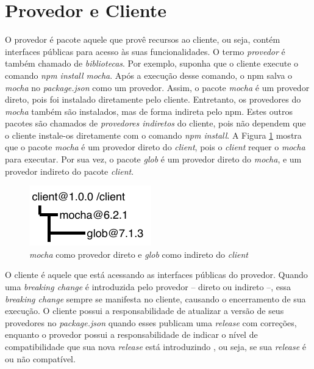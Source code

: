 \section{Provedor e Cliente}
\label{ref-teo:prov_clie}
O provedor é pacote aquele que provê recursos ao cliente, ou seja, contém interfaces públicas para acesso às suas funcionalidades. O termo \textit{provedor} é também chamado de \textit{bibliotecas}. Por exemplo, suponha que o cliente execute o comando \textit{npm install mocha}. Após a execução desse comando, o \gls{npm} salva o \textit{mocha} no \textit{package.json} como um provedor. Assim, o pacote \textit{mocha} é um provedor direto, pois foi instalado diretamente pelo cliente. Entretanto, os provedores do \textit{mocha} também são instalados, mas de forma indireta pelo \gls{npm}. Estes outros pacotes são chamados de \textit{provedores indiretos} do cliente, pois não dependem que o cliente instale-os diretamente com o comando \textit{npm install}. A Figura \ref{fig:provider} mostra que o pacote \textit{mocha} é um provedor direto do \textit{client}, pois o \textit{client} requer o \textit{mocha} para executar. Por sua vez, o pacote \textit{glob} é um provedor direto do \textit{mocha}, e um provedor indireto do pacote \textit{client}.

\begin{figure}
    \centering
    \includegraphics[scale=1.4]{figuras/provider_directly_undirectly.pdf}
    \caption{\textit{mocha} como provedor direto e \textit{glob} como indireto do \textit{client}}
    \label{fig:provider}
\end{figure}{}

O cliente é aquele que está acessando as interfaces públicas do provedor. Quando uma \textit{breaking change} é introduzida pelo provedor -- direto ou indireto --, essa \textit{breaking change} sempre se manifesta no cliente, causando o encerramento de sua execução. O cliente possui a responsabilidade de atualizar a versão de seus provedores no \textit{package.json} quando esses publicam uma \textit{release} com correções, enquanto o provedor possui a responsabilidade de indicar o nível de compatibilidade que sua nova \textit{release} está introduzindo \cite{teorical_reference:semver}, ou seja, se sua \textit{release} é ou não compatível.

